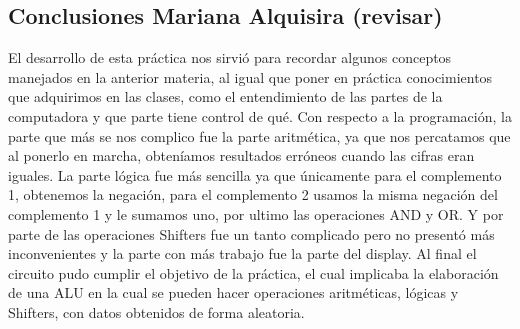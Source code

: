 	\subsection{Conclusiones Mariana Alquisira (revisar)}
	El desarrollo de esta pr\'actica nos sirvi\'o para recordar algunos conceptos manejados en la anterior materia, al igual que poner en pr\'actica conocimientos que adquirimos en las clases, como el entendimiento de las partes de la computadora y que parte tiene control de qu\'e.
Con respecto a la programaci\'on, la parte que m\'as se nos complico fue la parte aritm\'etica, ya que nos percatamos que al ponerlo en marcha, obten\'iamos resultados err\'oneos cuando las cifras eran iguales. La parte l\'ogica fue m\'as sencilla ya que \'unicamente para el complemento 1, obtenemos la negaci\'on, para el complemento 2 usamos la misma negaci\'on del complemento 1 y le sumamos uno, por ultimo las operaciones AND y OR. Y por parte de las operaciones Shifters fue un tanto complicado pero no present\'o m\'as inconvenientes y la parte con m\'as trabajo fue la parte del display.
Al final el circuito pudo cumplir el objetivo de la pr\'actica, el cual implicaba la elaboraci\'on de una ALU en la cual se pueden hacer operaciones aritm\'eticas, l\'ogicas y Shifters, con datos obtenidos de forma aleatoria.